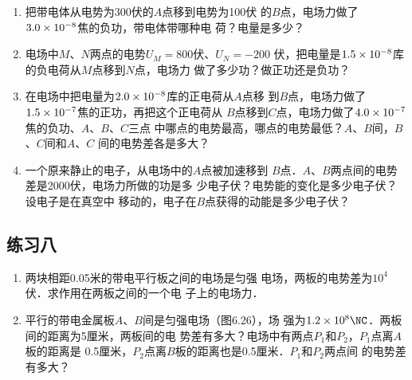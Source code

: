 \begin{enumerate}
	\item 把带电体从电势为300伏的$A$点移到电势为100伏
的$B$点，电场力做了$3.0\times10^{-8}$焦的负功，带电体带哪种电
荷？电量是多少？
\item 电场中$M$、$N$两点的电势$U_M=800$伏、$U_N=-200$
伏，把电量是$1.5\times10^{-8}$库的负电荷从$M$点移到$N$点，电场力
做了多少功？做正功还是负功？
\item 在电场中把电量为$2.0\times10^{-8}$库的正电荷从$A$点移
到$B$点，电场力做了$1.5\times10^{-7}$焦的正功，再把这个正电荷从
$B$点移到$C$点，电场力做了$4.0\times10^{-7}$焦的负功、$A$、$B$、$C$三点
中哪点的电势最高，哪点的电势最低？$A$、$B$间，$B$、$C$间和$A$、$C$
间的电势差各是多大？
\item 一个原来静止的电子，从电场中的$A$点被加速移到
$B$点．$A$、$B$两点间的电势差是2000伏，电场力所做的功是多
少电子伏？电势能的变化是多少电子伏？设电子是在真空中
移动的，电子在$B$点获得的动能是多少电子伏？
\end{enumerate}


\subsection{练习八}

\begin{enumerate}
	\item 两块相距0.05米的带电平行板之间的电场是匀强
	电场，两板的电势差为$10^4$伏．求作用在两板之间的一个电
	子上的电场力．
	\item 平行的带电金属板$A$、$B$间是匀强电场（图6.26），场
	强为$1.2\x10^8\NC$．两板间的距离为5厘米，两板间的电
	势差有多大？电场中有两点$P_1$和$P_2$，$P_1$点离$A$板的距离是
	0.5厘米，$P_2$点离$B$板的距离也是0.5厘米．$P_1$和$P_2$两点间
	的电势差有多大？
\end{enumerate}


